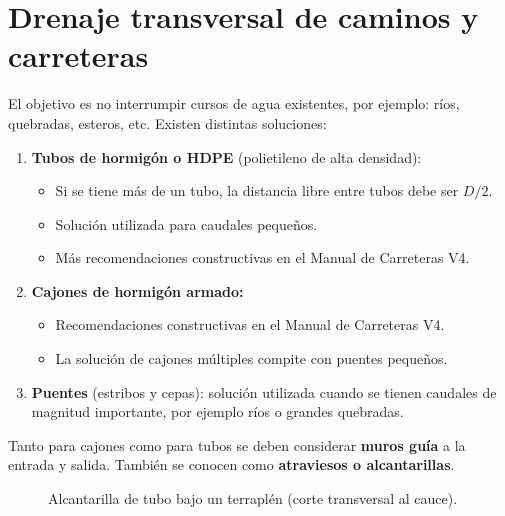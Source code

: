 
\section{Drenaje transversal de caminos y carreteras}
El objetivo es no interrumpir cursos de agua existentes, por ejemplo: ríos,
quebradas, esteros, etc. Existen distintas soluciones:
\begin{enumerate}
  \item \textbf{Tubos de hormigón o HDPE} (polietileno de alta densidad):
  \begin{itemize}
    \item Si se tiene más de un tubo, la distancia libre entre tubos debe ser $D/2$.
    \item Solución utilizada para caudales pequeños.
    \item Más recomendaciones constructivas en el Manual de Carreteras V4.
  \end{itemize}
  \item \textbf{Cajones de hormigón armado:}
  \begin{itemize}
    \item Recomendaciones constructivas en el Manual de Carreteras V4.
    \item La solución de cajones múltiples compite con puentes pequeños.
  \end{itemize}
  \item \textbf{Puentes} (estribos y cepas): solución utilizada cuando se
        tienen caudales de magnitud importante, por ejemplo ríos o grandes quebradas.
\end{enumerate}
Tanto para cajones como para tubos se deben considerar \textbf{muros guía} a
la entrada y salida. También se conocen como \textbf{atraviesos o alcantarillas}.

\begin{figure}[H]
\centering
{}
\caption{Alcantarilla de tubo bajo un terraplén (corte transversal al cauce).}
\end{figure}

